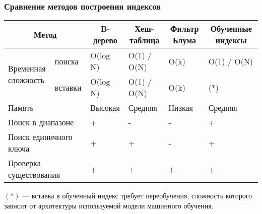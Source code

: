 \documentclass[8pt]{bmstu-pr}
\begin{document}
\begin{frame}
    \fontsize{22pt}{22pt}\selectfont
    \frametitle{Сравнение методов построения индексов}

{
\fontsize{20pt}{20pt}\selectfont
\renewcommand{\arraystretch}{1.5}
\begin{longtable}[Hc]{|p{4cm}|p{1.5cm}|p{3cm}|p{4cm}|p{2.5cm}|p{4cm}|}
    \hline
    \multicolumn{2}{|c|}{\textbf{Метод}} &
    \multicolumn{1}{c|}{\textbf{B-дерево}} &
    \multicolumn{1}{c|}{\textbf{Хеш-таблица}} &
    \multicolumn{1}{c|}{\parbox{2.5cm}{\centering\textbf{Фильтр Блума}}} &
    \multicolumn{1}{c|}{\parbox{4cm}{\centering\textbf{Обученные индексы}}}\\
    \hline
    \multirow{2}{*}{\parbox{2cm}{Временная\\сложность}} &
    поиска & O(log N) & O(1) / O(N) & O(k) & O(1) / O(N)\\
    \cline{2-6}
    & вставки & O(log N) & O(1) / O(N) & O(k) & (*)\\
    \hline
    \multicolumn{2}{|l|}{Память} & Высокая & Средняя & Низкая & Средняя\\
    \hline
    \multicolumn{2}{|l|}{Поиск в диапазоне} & + & - & - & + \\
    \hline
    \multicolumn{2}{|l|}{Поиск единичного ключа} & + & + & - & + \\
    \hline
    \multicolumn{2}{|l|}{Проверка существования} & + & + & + & + \\
    \hline
\end{longtable}
}

$(*)$ --- вставка в обученный индекс требует переобучения, сложность которого
зависит от архитектуры используемой модели машинного обучения.
\end{frame}

\end{document}
